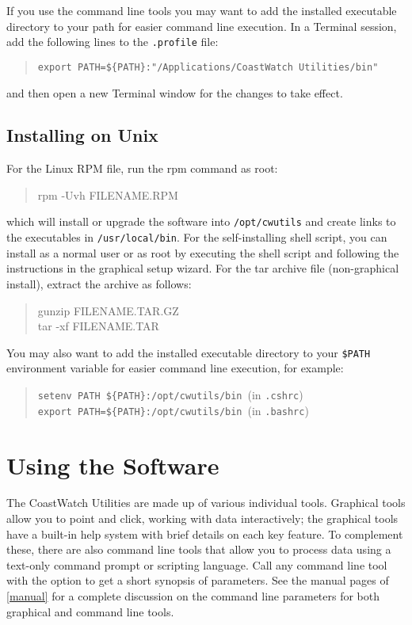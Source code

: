 {If you use the command line tools you may want to add the installed
executable directory to your path for easier command line execution.
In a Terminal session, add the following lines to the {\tt .profile}
file:
\begin{quote}
  {\tt export PATH=\$\{PATH\}:"/Applications/CoastWatch Utilities/bin"}
\end{quote}
and then open a new Terminal window for the changes to take effect.

\subsection{Installing on Unix}

For the Linux RPM file, run the rpm command as root:
\begin{quote}
  {\file rpm -Uvh} FILENAME.RPM
\end{quote}
which will install or upgrade the software into {\tt /opt/cwutils} and create
links to the executables in {\tt /usr/local/bin}. For 
the self-installing shell script, you can
install as a normal user or as root by executing the shell script
and following the instructions in the graphical setup wizard.
For the tar archive file (non-graphical install),
extract the archive as follows:
\begin{quote}
  {\file gunzip} FILENAME.TAR.GZ \\
  {\file tar -xf} FILENAME.TAR
\end{quote}
You may also want to add the installed executable directory to
your {\tt \$PATH} environment variable for easier command line
execution, for example:
\begin{quote}
  {\tt setenv PATH \$\{PATH\}:/opt/cwutils/bin}~(in {\tt .cshrc}) \\
  {\tt export PATH=\$\{PATH\}:/opt/cwutils/bin}~(in {\tt .bashrc})
\end{quote}

\section{Using the Software}

The CoastWatch Utilities are made up of various individual tools.
Graphical tools allow you to point and click, working with data
interactively; the graphical tools have a built-in help system
with brief details on each key feature.  To complement these,
there are also command line tools that allow you to process data
using a text-only command prompt or scripting language.  Call any
command line tool with the  option to get a
short synopsis of parameters.  See the manual pages of
\autoref{manual} for a complete discussion on the command line
parameters for both graphical and command line tools.

}
